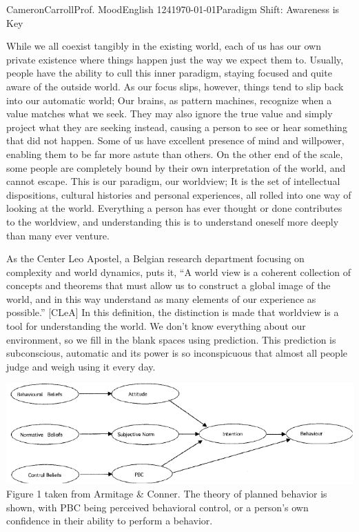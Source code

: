 \documentclass[12pt,letterpaper]{article}
\begin{document}
\begin{mla}{Cameron}{Carroll}{Prof. Mood}{English 124}{\today}{Paradigm Shift: Awareness is Key}

While we all coexist tangibly in the existing world, each of us has our own private existence where things happen just the way we expect them to. Usually, people have the ability to cull this inner paradigm, staying focused and quite aware of the outside world. As our focus slips, however, things tend to slip back into our automatic world; Our brains, as pattern machines, recognize when a value matches what we seek. They may also ignore the true value and simply project what they are seeking instead, causing a person to see or hear something that did not happen. Some of us have excellent presence of mind and willpower, enabling them to be far more astute than others. On the other end of the scale, some people are completely bound by their own interpretation of the world, and cannot escape. This is our paradigm, our worldview; It is the set of intellectual dispositions, cultural histories and personal experiences, all rolled into one way of looking at the world. Everything a person has ever thought or done contributes to the worldview, and understanding this is to understand oneself more deeply than many ever venture.

As the Center Leo Apostel, a Belgian research department focusing on complexity and world dynamics, puts it, ``A world view is a coherent collection of concepts and theorems that must allow us to construct a global image of the world, and in this way understand as many elements of our experience as possible.'' [CLeA] In this definition, the distinction is made that worldview is a tool for understanding the world. We don't know everything about our environment, so we fill in the blank spaces using prediction. This prediction is subconscious, automatic and its power is so inconspicuous that almost all people judge and weigh using it every day. 

\includegraphics{fig1.png}
{\small Figure 1 taken from Armitage \& Conner. The theory of planned behavior is shown, with PBC being perceived behavioral control, or a person's own confidence in their ability to perform a behavior.}
\vspace{7 mm}


\end{mla}
\end{document}
